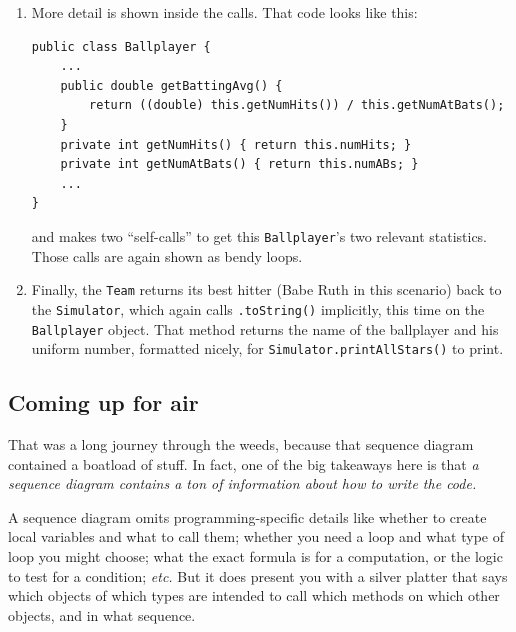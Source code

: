 \begin{enumerate}
All of this is faithfully represented in the sequence diagram. First, the
\texttt{Team} object calls \texttt{.size()} (and gets ``2'' back). Then it
calls \texttt{.get(0)} (and gets back a player; let's say Babe Ruth), and then
calls \texttt{.getBattingAvg()} on it (getting the number .342, a jaw-dropping
lifetime average, especially for a power hitter). A moment later, it does the
same with the second player (say, Joe Dimaggio) and gets his average (still
amazing, but ``only'' .325) for comparison.

\item More detail is shown inside the  calls.
That code looks like this:

\begin{Verbatim}[fontsize=\scriptsize,samepage=true,frame=single]
public class Ballplayer {
    ...
    public double getBattingAvg() {
        return ((double) this.getNumHits()) / this.getNumAtBats();
    }
    private int getNumHits() { return this.numHits; }
    private int getNumAtBats() { return this.numABs; }
    ...
}
\end{Verbatim}

and makes two ``self-calls'' to get this \texttt{Ballplayer}'s two relevant
statistics. Those calls are again shown as bendy loops.

\item Finally, the \texttt{Team} returns its best hitter (Babe Ruth in this
scenario) back to the \texttt{Simulator}, which again calls
\texttt{.toString()} implicitly, this time on the \texttt{Ballplayer} object.
That method returns the name of the ballplayer and his uniform number,
formatted nicely, for \texttt{Simulator.printAllStars()} to print.

\end{enumerate}

\subsection{Coming up for air}

That was a long journey through the weeds, because that sequence diagram
contained a boatload of stuff. In fact, one of the big takeaways here is that
\textit{a sequence diagram contains a ton of information about how to write
the code.}

A sequence diagram omits programming-specific details like whether to create
local variables and what to call them; whether you need a loop and what type
of loop you might choose; what the exact formula is for a computation, or the
logic to test for a condition; \textit{etc.} But it does present you with a
silver platter that says which objects of which types are intended to call
which methods on which other objects, and in what sequence.

